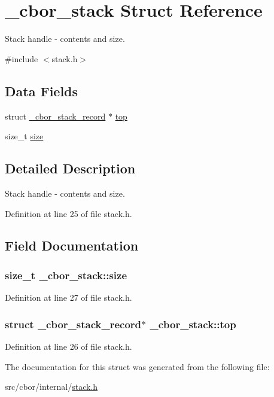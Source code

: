 \hypertarget{struct__cbor__stack}{\section{\-\_\-cbor\-\_\-stack Struct Reference}
\label{struct__cbor__stack}
}


Stack handle -\/ contents and size.  




{\ttfamily \#include $<$stack.\-h$>$}

\subsection*{Data Fields}
\begin{DoxyCompactItemize}
\item 
struct \hyperlink{struct__cbor__stack__record}{\-\_\-cbor\-\_\-stack\-\_\-record} $\ast$ \hyperlink{struct__cbor__stack_a559869a03a766ae041b1e385ceb34026}{top}
\item 
size\-\_\-t \hyperlink{struct__cbor__stack_aab7d9aefcd1c46603350a1d009c048d8}{size}
\end{DoxyCompactItemize}


\subsection{Detailed Description}
Stack handle -\/ contents and size. 

Definition at line 25 of file stack.\-h.



\subsection{Field Documentation}
\hypertarget{struct__cbor__stack_aab7d9aefcd1c46603350a1d009c048d8}{
\subsubsection[{size}]{\setlength{\rightskip}{0pt plus 5cm}size\-\_\-t \-\_\-cbor\-\_\-stack\-::size}}\label{struct__cbor__stack_aab7d9aefcd1c46603350a1d009c048d8}


Definition at line 27 of file stack.\-h.

\hypertarget{struct__cbor__stack_a559869a03a766ae041b1e385ceb34026}{
\subsubsection[{top}]{\setlength{\rightskip}{0pt plus 5cm}struct {\bf \-\_\-cbor\-\_\-stack\-\_\-record}$\ast$ \-\_\-cbor\-\_\-stack\-::top}}\label{struct__cbor__stack_a559869a03a766ae041b1e385ceb34026}


Definition at line 26 of file stack.\-h.



The documentation for this struct was generated from the following file\-:\begin{DoxyCompactItemize}
\item 
src/cbor/internal/\hyperlink{stack_8h}{stack.\-h}\end{DoxyCompactItemize}
